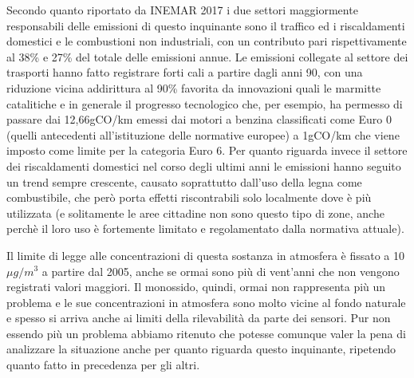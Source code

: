 \documentclass[a4paper]{report}
\begin{document}
Secondo quanto riportato da INEMAR 2017 i due settori maggiormente responsabili delle emissioni di questo inquinante sono il traffico ed i riscaldamenti domestici e le combustioni non industriali, con un contributo pari rispettivamente al 38\% e 27\% del totale delle emissioni annue. Le emissioni collegate al settore dei trasporti hanno fatto registrare forti cali a partire dagli anni 90, con una riduzione vicina addirittura al 90\% favorita da innovazioni quali le marmitte catalitiche e in generale il progresso tecnologico che, per esempio, ha permesso di passare dai 12,66gCO/km emessi dai motori a benzina classificati come Euro 0 (quelli antecedenti all'istituzione delle normative europee) a 1gCO/km che viene imposto come limite per la categoria Euro 6.
Per quanto riguarda invece il settore dei riscaldamenti domestici nel corso degli ultimi anni le emissioni hanno seguito un trend sempre crescente, causato soprattutto dall'uso della legna come combustibile, che però porta effetti riscontrabili solo localmente dove è più utilizzata (e solitamente le aree cittadine non sono questo tipo di zone, anche perchè il loro uso è fortemente limitato e regolamentato dalla normativa attuale).

Il limite di legge alle concentrazioni di questa sostanza in atmosfera è fissato a 10 $\mu g/m^3$ a partire dal 2005, anche se ormai sono più di vent'anni che non vengono registrati valori maggiori. Il monossido, quindi, ormai non rappresenta più un problema e le sue concentrazioni in atmosfera sono molto vicine al fondo naturale \cite{arpa2018rapporto}
 e spesso si arriva anche ai limiti della rilevabilità da parte dei sensori.
Pur non essendo più un problema abbiamo ritenuto che potesse comunque valer la pena di analizzare la situazione anche per quanto riguarda questo inquinante, ripetendo quanto fatto in precedenza per gli altri.
\end{document}

